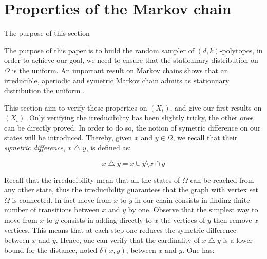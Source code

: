 \documentclass[a4paper]{article}
\begin{document}
\section{Properties of the Markov chain}\label{Sec.Pr}

The purpose of this section

The purpose of this paper is to build the random sampler of $(d,k)$-polytopes, in order to achieve our goal, we need to ensure that the stationnary distribution on $\Omega$ is the uniform. An important result on Markov chains shows that an irreducible, aperiodic and symetric Markov chain admits as stationnary distribution the uniform \cite{levin2009markov}.

This section aim to verify these properties on $(X_t)$, and give our first results on $(X_t)$. Only verifying the irreducibility has been slightly tricky, the other ones can be directly proved. In order to do so, the notion of symetric difference on our states will be introduced. Thereby, given $x$ and $y \in \Omega$, we recall that their \textit{symetric difference}, $x \bigtriangleup y$, is defined as:

\begin{equation}
  x \bigtriangleup y = x \cup y \setminus x \cap y
\end{equation}

%

  Recall that the irreducibility mean that all the states of $\Omega$ can be reached from any other state, thus the irreducibility guarantees that the graph with vertex set $\Omega$ is connected. In fact move from $x$ to $y$ in our chain consists in finding finite number of transitions between $x$ and $y$ by one. Observe that the simplest way to move from $x$ to $y$ consists in adding directly to $x$ the vertices of $y$ then remove $x$ vertices. This means that at each step one reduces the symetric difference between $x$ and $y$. Hence, one can verify that the cardinality of $x \bigtriangleup y$ is a lower bound for the distance, noted $\delta(x,y)$, between $x$ and $y$. One has:
\end{document}
